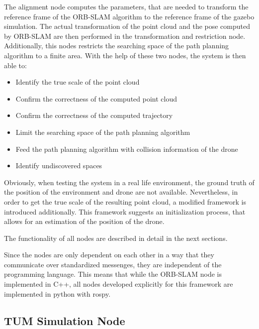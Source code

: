 	The alignment node computes the parameters, that are needed to transform the reference frame of the ORB-SLAM algorithm to the reference frame of the gazebo simulation. 
	The actual transformation of the point cloud and the pose computed by ORB-SLAM are then performed in the transformation and restriction node. Additionally, this nodes 
	restricts the searching space of the path planning algorithm to a finite area. With the help of these two nodes, the system is then able to: 
	
	\begin{itemize}
	
	\item{Identify the true scale of the point cloud}
	\item{Confirm the correctness of the computed point cloud}
	\item{Confirm the correctness of the computed trajectory}
	\item{Limit the searching space of the path planning algorithm}
	\item{Feed the path planning algorithm with collision information of the drone}
	\item{Identify undiscovered spaces} 
	
	\end{itemize}
	
	
	
	Obviously, when testing the system in a real life environment, the ground truth of the position of the environment and drone are not available. 
	Nevertheless, in order to get the true scale of the resulting point cloud, a modified framework is introduced additionally. This framework suggests an 
	initialization process, that allows for an estimation of the position of the drone. 
	
	The functionality of all nodes are described in detail in the next sections. 
	
	Since the nodes are only dependent on each other in a way that they communicate over standardized messenges, they are independent of the programming language. 
	This means that while the ORB-SLAM node is implemented in C++, all nodes developed explicitly for this framework are implemented in python with rospy. 
	
	\subsection{TUM Simulation Node} \label{tumsec}
	
